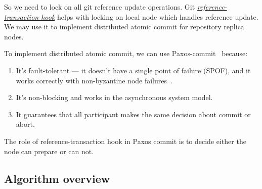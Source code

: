 \documentclass[sigplan, screen, nonacm, 11pt]{acmart}
\begin{document}
So we need to lock on all git reference update operations.
Git \emph{\href{https://git-scm.com/docs/githooks.html\#\_reference\_transaction}{reference-transaction hook}}
helps with locking on local node which handles reference update. We may use it to implement distributed atomic commit
for repository replica nodes.

To implement distributed atomic commit, we can use Paxos-commit~\cite{paxos-commit} because:
\begin{enumerate}
  \item It's fault-tolerant --- it doesn't have a single point of failure (SPOF), and it works correctly with
    non-byzantine node failures~\cite{byzantine-generals}.
  \item It's non-blocking and works in the asynchronous system model.
  \item It guarantees that all participant makes the same decision about commit or abort.
\end{enumerate}

The role of reference-transaction hook in Paxos commit is to decide either the node can prepare or can not.

\subsection{Algorithm overview}
\end{document}
